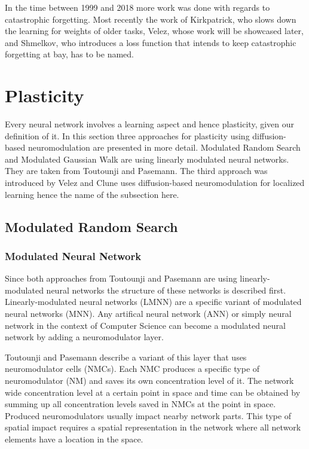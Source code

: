 \documentclass[12pt,twoside]{scrartcl}
\theoremstyle{plain}
\theoremstyle{definition}
\theoremstyle{remark}
\begin{document}
In the time between 1999 and 2018 more work was done with regards to catastrophic
forgetting. Most recently the work of Kirkpatrick\cite{Kirkpatrick2017}, who
slows down the learning for weights of older tasks,
Velez\cite{Velez2017}, whose work will be showcased later, and
Shmelkov\cite{Shmelkov2017}, who introduces a loss function that intends to keep
catastrophic forgetting at bay, has to be named.

\section{Plasticity}
\label{sec:plasticity}

Every neural network involves a learning aspect and hence plasticity, given our
definition of it. In this section three approaches for plasticity using diffusion-based
neuromodulation are presented in more detail. Modulated Random Search and
Modulated Gaussian Walk are using linearly modulated neural networks. They
are taken from Toutounji and Pasemann\cite{Toutounji2016}. The third approach
was introduced by Velez and Clune\cite{Velez2017} uses diffusion-based neuromodulation
for localized learning hence the name of the subsection here.

\subsection{Modulated Random Search}
\label{subsec:mrs}

\subsubsection*{Modulated Neural Network}

Since both approaches from Toutounji and Pasemann are using linearly-modulated
neural networks the structure of these networks is described first. Linearly-modulated
neural networks (LMNN) are a specific variant of modulated neural
networks (MNN). Any artifical neural network (ANN) or simply neural network
in the context of Computer Science can become a modulated neural network by
adding a neuromodulator layer.

Toutounji and Pasemann describe a variant of this layer that uses neuromodulator
cells (NMCs). Each NMC produces a specific type of neuromodulator (NM) and
saves its own concentration level of it. The network wide concentration level at
a certain point in space and time can be obtained by summing up all concentration
levels saved in NMCs at the point in space. Produced neuromodulators usually
impact nearby network parts. This type of spatial impact requires a spatial
representation in the network where all network elements have a location in
the space.
\end{document}
